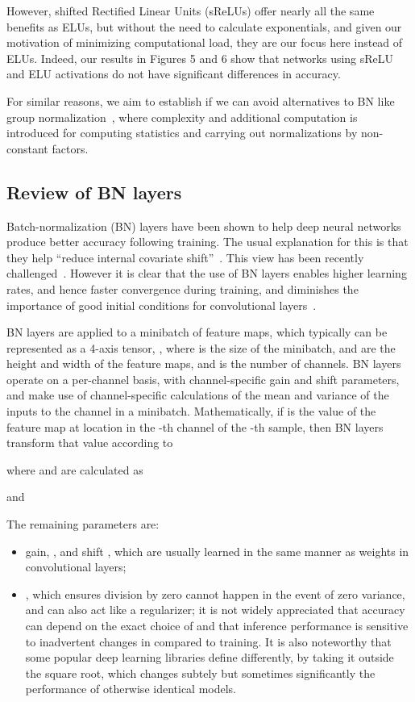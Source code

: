 \documentclass[conference]{IEEEtran}
\begin{document}
However, shifted Rectified Linear Units (sReLUs) offer nearly all the same benefits as ELUs, but without the need to calculate exponentials, and given our motivation of minimizing computational load, they are our focus here instead of ELUs. Indeed, our results in Figures 5 and 6 show that networks using sReLU and ELU activations do not have significant differences in accuracy. 

For similar reasons, we aim to establish if we can avoid alternatives to BN like group normalization~\cite{Wu.18}, where  complexity and additional computation is introduced for computing statistics and carrying out normalizations by non-constant factors.

 
\subsection{Review of BN layers} 

Batch-normalization (BN) layers have been shown to help deep neural networks produce better accuracy following training. The usual explanation for this is that they help ``reduce internal covariate shift''~\cite{Ioffe.15}. This view has been recently challenged~\cite{Santurkar.18}. However it is clear that the use of BN layers enables higher learning rates, and hence faster convergence during training, and diminishes the importance of good initial conditions for convolutional layers~\cite{Ioffe.15,Ioffe.17}. 

BN layers are applied to a minibatch of feature maps, which typically can be represented as a 4-axis tensor, , where  is the size of the minibatch,  and  are the height and width of the feature maps, and  is the number of channels. BN layers operate on a per-channel basis, with channel-specific gain and shift parameters, and make use of channel-specific calculations of the mean and variance of the inputs to the channel in a minibatch. Mathematically, if  is the value of the feature map at location  in the -th channel of the -th sample, then BN layers transform that value according to

where  and  are calculated as

 and
 
 The remaining parameters are:
 \begin{itemize}
     \item gain, , and shift , which are usually learned in the same manner as weights in convolutional layers;
     \item , which ensures division by zero cannot happen in the event of zero variance, and can also act like a regularizer; it is not widely appreciated that accuracy can depend on the exact choice of  and that inference performance is sensitive to inadvertent changes in  compared to training. It is also noteworthy that some popular deep learning libraries define  differently, by taking it outside the square root, which changes subtely but sometimes significantly the performance of otherwise identical models. 
 \end{itemize}
 
\end{document}
